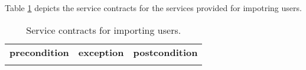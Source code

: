 Table \ref{tab:userImport} depicts the service contracts for the services provided for impotring users.

\begin{table}[htb]
\caption{Service contracts for importing users. \label{tab:teaminfoimport}}
\label{tab:userImport}
\begin{tabular}{l l l}
\hline
\noalign{\smallskip}
\textbf{precondition}&\textbf{exception} &\textbf{postcondition}\\
\noalign{\smallskip}
\hline

\noalign{\smallskip}
\hline
\end{tabular}  
\end{table}
 